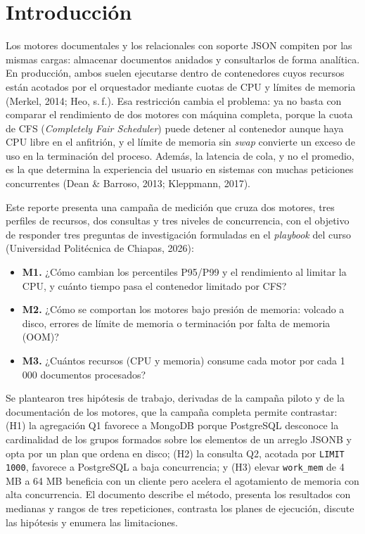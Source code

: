 \documentclass[12pt,letterpaper]{article}
\newcommand{\code}[1]{\texttt{#1}}
\begin{document}
\section{Introducción}
Los motores documentales y los relacionales con soporte JSON compiten por las mismas cargas: almacenar documentos
anidados y consultarlos de forma analítica. En producción, ambos suelen ejecutarse dentro de contenedores
cuyos recursos están acotados por el orquestador mediante cuotas de CPU y límites de memoria
(Merkel, 2014; Heo, s.\,f.). Esa restricción cambia el problema: ya no basta con comparar el rendimiento de dos
motores con máquina completa, porque la cuota de CFS (\textit{Completely Fair Scheduler}) puede detener al contenedor
aunque haya CPU libre en el anfitrión, y el límite de memoria sin \textit{swap} convierte un exceso de uso en la
terminación del proceso. Además, la latencia de cola, y no el promedio, es la que determina la experiencia del usuario en
sistemas con muchas peticiones concurrentes (Dean \& Barroso, 2013; Kleppmann, 2017).

Este reporte presenta una campaña de medición que cruza dos motores, tres perfiles de recursos, dos consultas y tres
niveles de concurrencia, con el objetivo de responder tres preguntas de investigación formuladas en el \textit{playbook}
del curso (Universidad Politécnica de Chiapas, 2026):

\begin{itemize}
\item \textbf{M1.} ¿Cómo cambian los percentiles P95/P99 y el rendimiento al limitar la CPU, y cuánto tiempo pasa el contenedor limitado por CFS?
\item \textbf{M2.} ¿Cómo se comportan los motores bajo presión de memoria: volcado a disco, errores de límite de memoria o terminación por falta de memoria (OOM)?
\item \textbf{M3.} ¿Cuántos recursos (CPU y memoria) consume cada motor por cada 1\,000 documentos procesados?
\end{itemize}

Se plantearon tres hipótesis de trabajo, derivadas de la campaña piloto y de la documentación de los motores, que la campaña completa permite contrastar: (H1) la agregación Q1 favorece a
MongoDB porque PostgreSQL desconoce la cardinalidad de los grupos formados sobre los elementos de un arreglo JSONB y
opta por un plan que ordena en disco; (H2) la consulta Q2, acotada por \code{LIMIT 1000}, favorece a PostgreSQL a baja
concurrencia; y (H3) elevar \code{work\_mem} de 4 MB a 64 MB beneficia con un cliente pero acelera el agotamiento de
memoria con alta concurrencia. El documento describe el método, presenta los resultados con medianas y rangos de tres
repeticiones, contrasta los planes de ejecución, discute las hipótesis y enumera las limitaciones.
\end{document}
